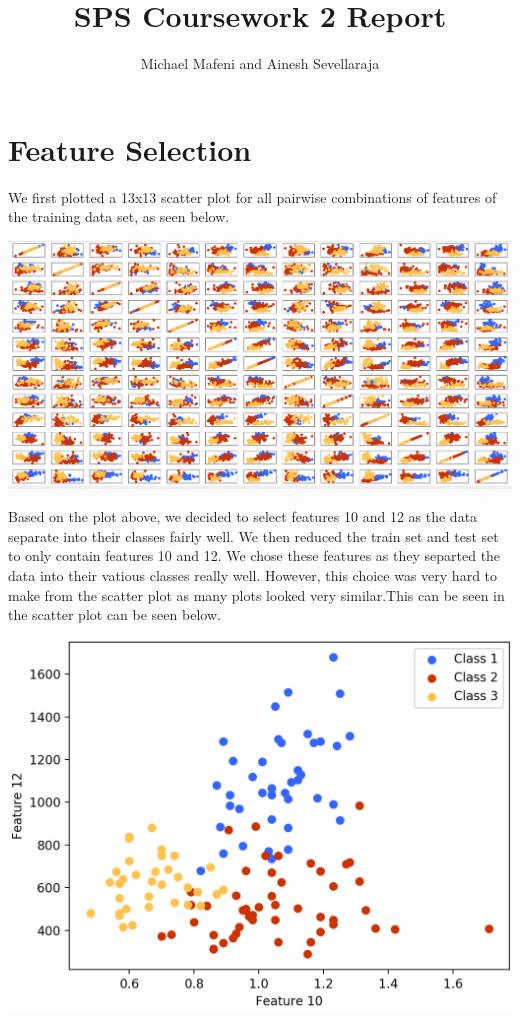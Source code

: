 \documentclass[11pt]{article}
\begin{document}
\title{SPS Coursework 2 Report}
\author{Michael Mafeni and Ainesh Sevellaraja}
\date{}
\maketitle

\section{Feature Selection}
We first plotted a 13x13 scatter plot for all pairwise combinations of features of the training data set, as seen below.

\begin{center}
\includegraphics[scale=0.25]{feature_selection}
\end{center}

Based on the plot above, we decided to select features 10 and 12 as the data separate into their classes fairly well. We then reduced the train set and test set to only contain features 10 and 12. We chose these features as they separted the data into their vatious classes really well. However, this choice was very hard to make from the scatter plot as many plots looked very similar.This can be seen in the scatter plot can be seen below.

\begin{center}
\includegraphics[scale=0.3]{features_10_12}
\end{center}
\end{document}
